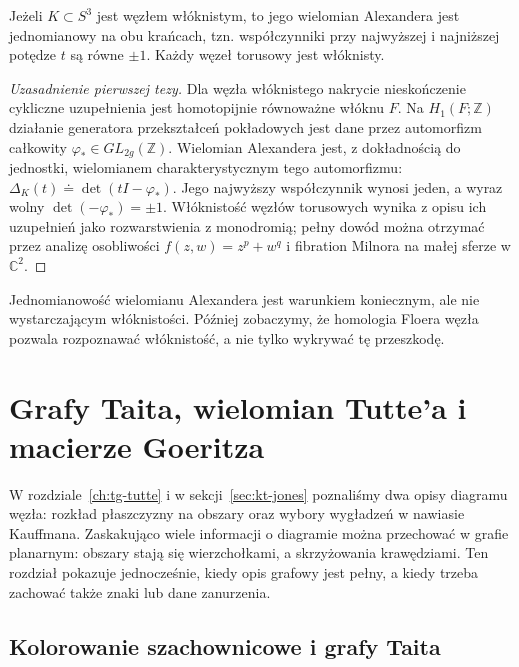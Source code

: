 \begin{twierdzenie}
Jeżeli $K\subset S^3$ jest węzłem włóknistym, to jego
wielomian Alexandera jest jednomianowy na obu krańcach,
tzn. współczynniki przy najwyższej i najniższej potędze
$t$ są równe $\pm1$. Każdy węzeł torusowy jest włóknisty.
\end{twierdzenie}

\begin{proof}[Uzasadnienie pierwszej tezy]
Dla węzła włóknistego nakrycie nieskończenie cykliczne
uzupełnienia jest homotopijnie równoważne włóknu $F$.
Na $H_1(F;\mathbb Z)$ działanie generatora przekształceń
pokładowych jest dane przez automorfizm całkowity
$\varphi_*\in GL_{2g}(\mathbb Z)$. Wielomian Alexandera
jest, z dokładnością do jednostki, wielomianem
charakterystycznym tego automorfizmu:
$\Delta_K(t)\doteq\det(tI-\varphi_*)$.
Jego najwyższy współczynnik wynosi jeden, a wyraz wolny
$\det(-\varphi_*)=\pm1$. Włóknistość węzłów torusowych
wynika z opisu ich uzupełnień jako rozwarstwienia z monodromią;
pełny dowód można otrzymać przez analizę osobliwości
$f(z,w)=z^p+w^q$ i fibration Milnora na małej sferze
w $\mathbb C^2$.
\end{proof}

\begin{uwaga}
Jednomianowość wielomianu Alexandera jest warunkiem koniecznym,
ale nie wystarczającym włóknistości. Później zobaczymy, że
homologia Floera węzła pozwala rozpoznawać włóknistość,
a nie tylko wykrywać tę przeszkodę.
\end{uwaga}



\chapter{Grafy Taita, wielomian Tutte'a i macierze Goeritza}
\label{ch:tg-tait-goeritz}

W rozdziale~\ref{ch:tg-tutte} i w sekcji~\ref{sec:kt-jones}
poznaliśmy dwa opisy diagramu węzła: rozkład płaszczyzny
na obszary oraz wybory wygładzeń w nawiasie Kauffmana.
Zaskakująco wiele informacji o diagramie można przechować
w grafie planarnym: obszary stają się wierzchołkami,
a skrzyżowania krawędziami. Ten rozdział pokazuje
jednocześnie, kiedy opis grafowy jest pełny, a kiedy
trzeba zachować także znaki lub dane zanurzenia.

\section{Kolorowanie szachownicowe i grafy Taita}
\label{sec:tg-tait-def}

